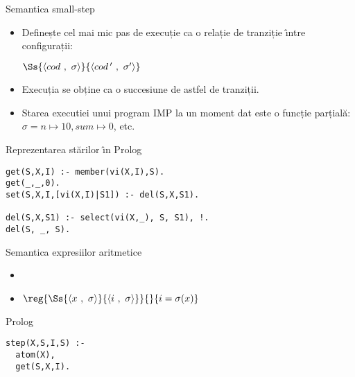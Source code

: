 \documentclass[xcolor=x11names,compress,10pt]{beamer}
\newcommand{\Conf}[2]{\ensuremath{\langle #1\ ,\ #2\rangle}}
\begin{document}
\begin{frame}[fragile]{Semantica small-step}
\vspace*{0.5cm}
\begin{itemize}
  \item Definește cel mai mic pas de execuție ca o relație de tranziție  \^{\i}ntre configurații:
  \begin{center}
	$\Ss{\Conf{cod}{\sigma}}{\Conf{cod\,'}{\sigma'}}$ \hfill{}
  \end{center}

  \item Execuția se obține ca o succesiune de astfel de tranziții.
  \item Starea executiei unui program IMP la un moment dat este o funcție parțială: $\sigma = n \mapsto 10, sum \mapsto 0$, etc.
\end{itemize}
 \begin{block}{Reprezentarea stărilor \^{\i}n Prolog}
\begin{verbatim} 
get(S,X,I) :- member(vi(X,I),S).
get(_,_,0).
set(S,X,I,[vi(X,I)|S1]) :- del(S,X,S1).

del(S,X,S1) :- select(vi(X,_), S, S1), !.
del(S, _, S).
\end{verbatim}
\end{block}
\end{frame}

  
\begin{frame}[fragile]{Semantica expresiilor aritmetice}
 
\begin{itemize}
  
   \item {}
	\item[] $\reg{\Ss{\Conf{x}{\sigma}}{\Conf{i}{\sigma}}}{}{i = \sigma(x)}$
   \end{itemize}
 \begin{block}{Prolog}
\begin{verbatim}  
step(X,S,I,S) :-
  atom(X),
  get(S,X,I).
\end{verbatim}
\end{block}   
  \end{frame}
  
\end{document}
